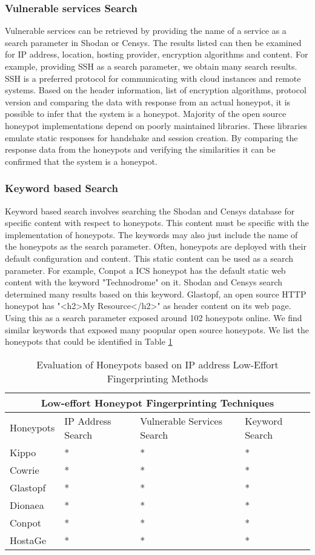 \documentclass[../main.tex]{subfiles}
\begin{document}
 \subsubsection{Vulnerable services Search}
 Vulnerable services can be retrieved by providing the name of a service as a search parameter in Shodan or Censys. The results listed can then be examined for IP address, location, hosting provider, encryption algorithms and content. For example, providing SSH as a search parameter, we obtain many search results. SSH is a preferred protocol for communicating with cloud instances and remote systems. Based on the header information, list of encryption algorithms, protocol version and comparing the data with response from an actual honeypot, it is possible to infer that the system is a honeypot. Majority of the open source honeypot implementations depend on poorly maintained libraries. These libraries emulate static responses for handshake and session creation. By comparing the response data from the honeypots and verifying the similarities it can be confirmed that the system is a honeypot. 
 
 \subsubsection{Keyword based Search}
Keyword based search involves searching the Shodan and Censys database for specific content with respect to honeypots. This content must be specific with the implementation of honeypots. The keywords may also just include the name of the honeypots as the search parameter. Often, honeypots are deployed with their default configuration and content. This static content can be used as a search parameter. For example, Conpot a ICS honeypot has the default static web content with the keyword "Technodrome" on it. Shodan and Censys search determined many results based on this keyword. Glastopf, an open source HTTP honeypot has "<h2>My Resource</h2>" as header content on its web page. Using this as a search parameter exposed around 102 honeypots online. We find similar keywords that exposed many poopular open source honeypots. We list the honeypots that could be identified in Table \ref{Tab:IP address}

 \begin{table}[]
 \begin{tabular}{ |p{1.5cm}||p{1.5cm}||p{1.2cm}|p{1.4cm}| }
 \hline
 \multicolumn{4}{|c|}{Low-effort Honeypot Fingerprinting Techniques} \\
 \hline
 Honeypots & IP Address Search & Vulnerable Services Search & Keyword Search \\
 \hline
 Kippo   & *  &* & *  \\
 Cowrie  & *  &* & *  \\
 Glastopf& *  &* & *  \\
 Dionaea & *  &* & *  \\
 Conpot  & *  &* & *  \\
 HostaGe & *  &*  &  *  \\
 \hline
\end{tabular}
 \caption{Evaluation of Honeypots based on IP address Low-Effort Fingerprinting Methods}
 \label{Tab:IP address}
 \end{table}
\end{document}
